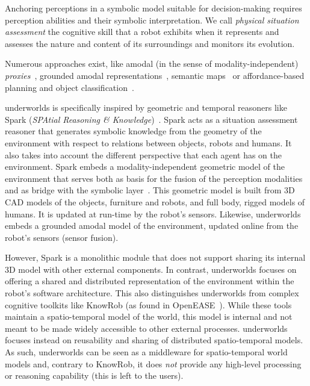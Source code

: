 \documentclass[letterpaper, 10pt, conference]{ieeeconf}
\newcommand{\uwds}{{\sc underworlds}\xspace}
\begin{document}
Anchoring perceptions in a symbolic model suitable for decision-making requires
perception abilities and their symbolic interpretation. We call \emph{physical
situation assessment} the cognitive skill that a robot exhibits when it
represents and assesses the nature and content of its surroundings and monitors
its evolution.

Numerous approaches exist, like amodal (in the sense of modality-independent)
\emph{proxies}~\cite{Jacobsson2008}, grounded amodal
representations~\cite{Mavridis2006}, semantic
maps~\cite{Nuechter2008, Galindo2008,Blodow2011} or affordance-based planning
and object classification~\cite{Lorken2008, Varadarajan2011}.


\uwds is specifically inspired by geometric and temporal reasoners like {\sc Spark}
(\emph{SPAtial Reasoning \& Knowledge})~\cite{sisbot2011situation}.  {\sc Spark}
acts as a situation assessment reasoner that generates symbolic knowledge from
the geometry of the environment with respect to relations between objects,
robots and humans. It also takes into account the different perspective that
each agent has on the environment. {\sc Spark} embeds a modality-independent
geometric model of the environment that serves both as basis for the fusion of
the perception modalities and as bridge with the symbolic
layer~\cite{lemaignan2016artificial}. This geometric model is built from 3D CAD
models of the objects, furniture and robots, and full body, rigged models of
humans. It is updated at run-time by the robot's sensors.  Likewise, \uwds
embeds a grounded amodal model of the environment, updated online from the
robot's sensors (sensor fusion).

However, {\sc Spark} is a monolithic module that does not support sharing its
internal 3D model with other external components. In contrast, \uwds focuses on
offering a shared and distributed representation of the environment within the
robot's software architecture. This also distinguishes \uwds from complex
cognitive toolkits like KnowRob (as found in OpenEASE~\cite{beetz2015open}).
While these tools maintain a spatio-temporal model of the world, this model is
internal and not meant to be made widely accessible to other external processes.
\uwds focuses instead on reusability and sharing of distributed spatio-temporal
models.  As such, \uwds can be seen as a middleware for spatio-temporal world
models and, contrary to KnowRob, it does \emph{not} provide any high-level
processing or reasoning capability (this is left to the users).
\end{document}

